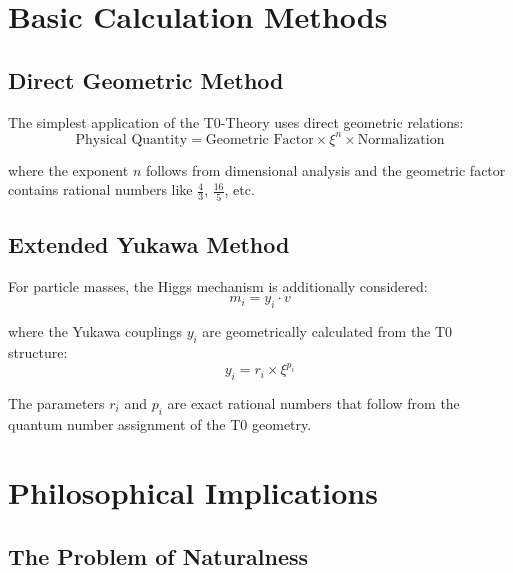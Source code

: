 \documentclass[12pt,a4paper]{article}
\begin{document}
	
	\section{Basic Calculation Methods}
	
	\subsection{Direct Geometric Method}
	
	The simplest application of the T0-Theory uses direct geometric relations:
	\begin{equation}
		\text{Physical Quantity} = \text{Geometric Factor} \times \xi^n \times \text{Normalization}
		\label{eq:direct_method}
	\end{equation}
	
	where the exponent $n$ follows from dimensional analysis and the geometric factor contains rational numbers like $\frac{4}{3}$, $\frac{16}{5}$, etc.
	
	\subsection{Extended Yukawa Method}
	
	For particle masses, the Higgs mechanism is additionally considered:
	\begin{equation}
		m_i = y_i \cdot v
		\label{eq:yukawa_method}
	\end{equation}
	
	where the Yukawa couplings $y_i$ are geometrically calculated from the T0 structure:
	\begin{equation}
		y_i = r_i \times \xi^{p_i}
		\label{eq:yukawa_coupling}
	\end{equation}
	
	The parameters $r_i$ and $p_i$ are exact rational numbers that follow from the quantum number assignment of the T0 geometry.
	
	\section{Philosophical Implications}
	
	\subsection{The Problem of Naturalness}
	
\end{document}

